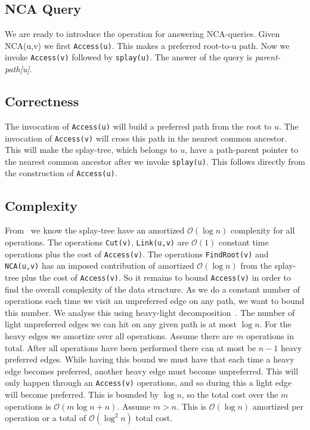 \documentclass[a4paper,oneside,article,11pt]{memoir}
\begin{document}
\subsection{NCA Query}
We are ready to introduce the operation for answering NCA-queries. Given NCA(u,v) we first \texttt{Access(u)}. This makes a preferred root-to-u path. Now we invoke \texttt{Access(v)} followed by \texttt{splay(u)}. The answer of the query is \textit{parent-path[u]}.

\subsection{Correctness}
The invocation of \texttt{Access(u)} will build a preferred path from the root to $u$. The invocation of \texttt{Access(v)} will cross this path in the nearest common ancestor. This will make the splay-tree, which belongs to $u$, have a path-parent pointer to the nearest common ancestor after we invoke \texttt{splay(u)}. This follows directly from the construction of \texttt{Access(u)}.

\subsection{Complexity}
From~\cite{Sleator1985} we know the splay-tree have an amortized $\mathcal{O}(\log n)$ complexity for all operations. The operations \texttt{Cut(v)}, \texttt{Link(u,v)} are $\mathcal{O}(1)$ constant time operations plus the cost of \texttt{Access(v)}. The operations \texttt{FindRoot(v)} and \texttt{NCA(u,v)} has an imposed contribution of amortized $\mathcal{O}(\log n)$ from the splay-tree plus the cost of \texttt{Access(v)}. So it remains to bound \texttt{Access(v)} in order to find the overall complexity of the data structure.
As we do a constant number of operations each time we visit an unpreferred edge on any path, we want to bound this number. We analyse this using heavy-light decomposition~\cite{jefferickson2006}. The number of light unpreferred edges we can hit on any given path is at most $\log n$. For the heavy edges we amortize over all operations. Assume there are $m$ operations in total. After all operations have been performed there can at most be $n-1$ heavy preferred edges. While having this bound we must have that each time a heavy edge becomes preferred, another heavy edge must become unpreferred. This will only happen through an \texttt{Access(v)} operations, and so during this a light edge will become preferred. This is bounded by $\log n$, so the total cost over the $m$ operations is $\mathcal{O}(m\log n + n)$. Assume $m > n$. This is $\mathcal{O}(\log n)$ amortized per operation or a total of $\mathcal{O}(\log^2 n)$ total cost.
\end{document}
